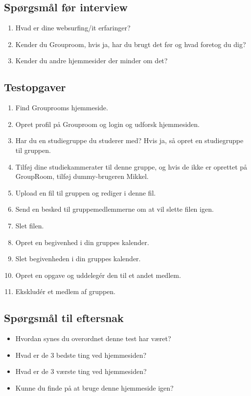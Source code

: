 \documentclass[12pt]{article}
\begin{document}
\subsection{Spørgsmål før interview}
\begin{enumerate}
  \item Hvad er dine websurfing/it erfaringer?
  \item Kender du Grouproom, hvis ja, har du brugt det før og hvad foretog du dig?
  \item Kender du andre hjemmesider der minder om det?
\end{enumerate}
\subsection{Testopgaver}
\begin{enumerate}
\item Find Grouprooms hjemmeside.
\item Opret profil på Grouproom og login og udforsk hjemmesiden.
\item Har du en studiegruppe du studerer med? Hvis ja, så opret en studiegruppe til gruppen.
\item Tilføj dine studiekammerater til denne gruppe, og hvis de ikke er oprettet på GroupRoom, tilføj dummy-brugeren Mikkel.
\item Upload en fil til gruppen og rediger i denne fil.
\item Send en besked til gruppemedlemmerne om at vil slette filen igen.
\item Slet filen.
\item Opret en begivenhed i din gruppes kalender.
\item Slet begivenheden i din gruppes kalender.
\item Opret en opgave og uddelegér den til et andet medlem.
\item Ekskludér et medlem af gruppen.
\end{enumerate}
\subsection{Spørgsmål til eftersnak}
\begin{itemize}
  \item Hvordan synes du overordnet denne test har været?
  \item Hvad er de 3 bedste ting ved hjemmesiden?
  \item Hvad er de 3 værste ting ved hjemmesiden?
  \item Kunne du finde på at bruge denne hjemmeside igen?
\end{itemize}
\end{document}
